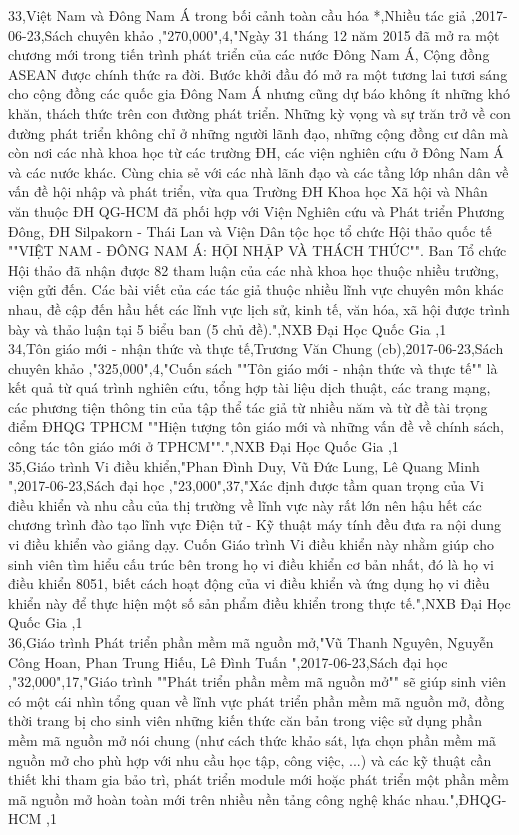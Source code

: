 \documentclass[a4paper]{article}
\begin{document}
33,Việt Nam và Đông Nam Á trong bối cảnh toàn cầu hóa *,Nhiều tác giả ,2017-06-23,Sách chuyên khảo ,"270,000",4,"Ngày 31 tháng 12 năm 2015 đã mở ra một chương mới trong tiến trình phát triển của các nước Đông Nam Á, Cộng đồng ASEAN được chính thức ra đời. Bước khởi đầu đó mở ra một tương lai tươi sáng cho cộng đồng các quốc gia Đông Nam Á nhưng cũng dự báo không ít những khó khăn, thách thức trên con đường phát triển. Những kỳ vọng và sự trăn trở về con đường phát triển không chỉ ở những người lãnh đạo, những cộng đồng cư dân mà còn nơi các nhà khoa học từ các trường ĐH, các viện nghiên cứu ở Đông Nam Á và các nước khác. Cùng chia sẻ với các nhà lãnh đạo và các tầng lớp nhân dân về vấn đề hội nhập và phát triển, vừa qua Trường ĐH Khoa học Xã hội và Nhân văn thuộc ĐH QG-HCM đã phối hợp với Viện Nghiên cứu và Phát triển Phương Đông, ĐH Silpakorn - Thái Lan và Viện Dân tộc học tổ chức Hội thảo quốc tế ""VIỆT NAM - ĐÔNG NAM Á: HỘI NHẬP VÀ THÁCH THỨC"". Ban Tổ chức Hội thảo đã nhận được 82 tham luận của các nhà khoa học thuộc nhiều trường, viện gửi đến. Các bài viết của các tác giả thuộc nhiều lĩnh vực chuyên môn khác nhau, đề cập đến hầu hết các lĩnh vực lịch sử, kinh tế, văn hóa, xã hội được trình bày và thảo luận tại 5 biểu ban (5 chủ đề).",NXB Đại Học Quốc Gia ,1\\
34,Tôn giáo mới - nhận thức và thực tế,Trương Văn Chung (cb),2017-06-23,Sách chuyên khảo ,"325,000",4,"Cuốn sách ""Tôn giáo mới - nhận thức và thực tế"" là kết quả từ quá trình nghiên cứu, tổng hợp tài liệu dịch thuật, các trang mạng, các phương tiện thông tin của tập thể tác giả từ nhiều năm và từ đề tài trọng điểm ĐHQG TPHCM ""Hiện tượng tôn giáo mới và những vấn đề về chính sách, công tác tôn giáo mới ở TPHCM"".",NXB Đại Học Quốc Gia ,1\\
35,Giáo trình Vi điều khiển,"Phan Đình Duy, Vũ Đức Lung, Lê Quang Minh ",2017-06-23,Sách đại học ,"23,000",37,"Xác định được tầm quan trọng của Vi điều khiển và nhu cầu của thị trường về lĩnh vực này rất lớn nên hậu hết các chương trình đào tạo lĩnh vực Điện tử - Kỹ thuật máy tính đều đưa ra nội dung vi điều khiển vào giảng dạy. Cuốn Giáo trình Vi điều khiển này nhằm giúp cho sinh viên tìm hiểu cấu trúc bên trong họ vi điều khiển cơ bản nhất, đó là họ vi điều khiển 8051, biết cách hoạt động của vi điều khiển và ứng dụng họ vi điều khiển này để thực hiện một số sản phẩm điều khiển trong thực tế.",NXB Đại Học Quốc Gia ,1\\
36,Giáo trình Phát triển phần mềm mã nguồn mở,"Vũ Thanh Nguyên, Nguyễn Công Hoan, Phan Trung Hiếu, Lê Đình Tuấn ",2017-06-23,Sách đại học ,"32,000",17,"Giáo trình ""Phát triển phần mềm mã nguồn mở"" sẽ giúp sinh viên có một cái nhìn tổng quan về lĩnh vực phát triển phần mềm mã nguồn mở, đồng thời trang bị cho sinh viên những kiến thức căn bản trong việc sử dụng phần mềm mã nguồn mở nói chung (như cách thức khảo sát, lựa chọn phần mềm mã nguồn mở cho phù hợp với nhu cầu học tập, công việc, ...) và các kỹ thuật cần thiết khi tham gia bảo trì, phát triển module mới hoặc phát triển một phần mềm mã nguồn mở hoàn toàn mới trên nhiều nền tảng công nghệ khác nhau.",ĐHQG-HCM ,1\\
\end{document}
